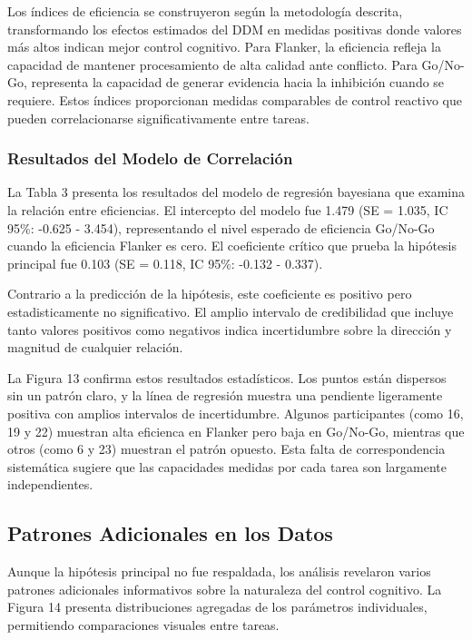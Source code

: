 \documentclass[
  spanish,
  10pt,
]{article}
\begin{document}
Los índices de eficiencia se construyeron según la metodología descrita,
transformando los efectos estimados del DDM en medidas positivas donde
valores más altos indican mejor control cognitivo. Para Flanker, la
eficiencia refleja la capacidad de mantener procesamiento de alta
calidad ante conflicto. Para Go/No-Go, representa la capacidad de
generar evidencia hacia la inhibición cuando se requiere. Estos índices
proporcionan medidas comparables de control reactivo que pueden
correlacionarse significativamente entre tareas.

\subsubsection{Resultados del Modelo de
Correlación}\label{resultados-del-modelo-de-correlaciuxf3n}

La Tabla 3 presenta los resultados del modelo de regresión bayesiana que
examina la relación entre eficiencias. El intercepto del modelo fue
1.479 (SE = 1.035, IC 95\%: -0.625 - 3.454), representando el nivel
esperado de eficiencia Go/No-Go cuando la eficiencia Flanker es cero. El
coeficiente crítico que prueba la hipótesis principal fue 0.103 (SE =
0.118, IC 95\%: -0.132 - 0.337).

Contrario a la predicción de la hipótesis, este coeficiente es positivo
pero estadisticamente no significativo. El amplio intervalo de
credibilidad que incluye tanto valores positivos como negativos indica
incertidumbre sobre la dirección y magnitud de cualquier relación.

La Figura 13 confirma estos resultados estadísticos. Los puntos están
dispersos sin un patrón claro, y la línea de regresión muestra una
pendiente ligeramente positiva con amplios intervalos de incertidumbre.
Algunos participantes (como 16, 19 y 22) muestran alta eficienca en
Flanker pero baja en Go/No-Go, mientras que otros (como 6 y 23) muestran
el patrón opuesto. Esta falta de correspondencia sistemática sugiere que
las capacidades medidas por cada tarea son largamente independientes.

\subsection{Patrones Adicionales en los
Datos}\label{patrones-adicionales-en-los-datos}

Aunque la hipótesis principal no fue respaldada, los análisis revelaron
varios patrones adicionales informativos sobre la naturaleza del control
cognitivo. La Figura 14 presenta distribuciones agregadas de los
parámetros individuales, permitiendo comparaciones visuales entre
tareas.
\end{document}

